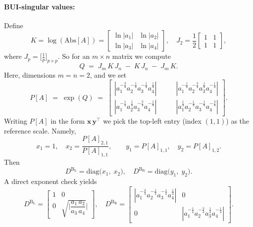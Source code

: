 \documentclass[11pt,a4paper]{article}
\begin{document}
\paragraph{BUI-singular values:} Define 
\begin{equation}
K = \log(\mathrm{Abs}[A]) = 
\begin{bmatrix}
\ln|a_1| & \ln|a_2|\\
\ln|a_3| & \ln|a_4|
\end{bmatrix},
\quad
J_2
=
\frac12
\begin{bmatrix}
1 & 1\\
1 & 1
\end{bmatrix},
\end{equation}
where $J_p = \big[\frac{1}{p}\big]_{p\times p}$. So for an $m \times n$ matrix we compute
\begin{equation}
Q 
\;=\;
J_m\,K\,J_n
\;-\;
K\,J_n
\;-\;
J_m\,K.
\end{equation}
Here, dimensions $m=n=2$, and we set 
\begin{equation}
P[A]
\;=\;
\exp(Q) \;=\; \begin{bmatrix}
|a_1^{-\tfrac34}a_2^{-\tfrac14}a_3^{-\tfrac14}a_4^{\tfrac14}| \quad \quad
&
|a_1^{-\tfrac14}a_2^{-\tfrac34}a_3^{\tfrac14}a_4^{-\tfrac14}|
\\[7pt]
|a_1^{-\tfrac14}a_2^{\tfrac14}a_3^{-\tfrac34}a_4^{-\tfrac14}| \quad \quad
&
|a_1^{\tfrac14}a_2^{-\tfrac14}a_3^{-\tfrac14}a_4^{-\tfrac34}|
\end{bmatrix}.
\end{equation}
Writing $P[A]$ in the form $\mathbf{x}\,\mathbf{y}^\top$ we
pick the top-left entry (index $(1,1)$) as the reference scale. Namely,
\begin{equation}
x_1 = 1,\quad
x_2 = \frac{P[A]_{2,1}}{P[A]_{1,1}},\qquad
y_1 = P[A]_{1,1},\quad
y_2 = P[A]_{1,2}.
\end{equation}
Then
\begin{equation}
D^{\mathrm{B_L}} = \mathrm{diag}\bigl(x_1,\;x_2\bigr), \quad
{D^{\mathrm{B_R}}} = \mathrm{diag}\bigl(y_1,\;y_2\bigr).
\end{equation}
A direct exponent check yields
\begin{equation}
D^{\mathrm{B_L}}
=
\begin{bmatrix}
1 & 0\\
0 & \sqrt{\bigg|\dfrac{a_1\,a_2}{a_3\,a_4}}\bigg|
\end{bmatrix},
\quad
{D^{\mathrm{B_R}}}
=
\begin{bmatrix}
|a_1^{-\tfrac34}a_2^{-\tfrac14}a_3^{-\tfrac14}a_4^{\tfrac14}| & 0\\[3pt]
0 & |a_1^{-\tfrac14}a_2^{-\tfrac34}a_3^{\tfrac14}a_4^{-\tfrac14}|
\end{bmatrix}.
\end{equation}
\end{document}
